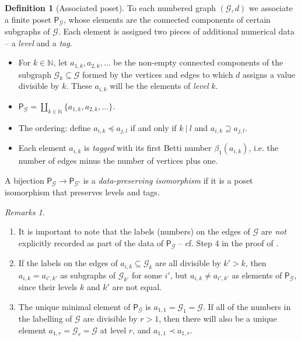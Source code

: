 \documentclass[11pt, a4 paper]{amsart}
\numberwithin{equation}{section}
\theoremstyle{remark}
\newtheorem{remarks}[theorem]{Remarks}
\theoremstyle{definition}
\newtheorem{definition}[theorem]{Definition}
\def\N{\mathbb N}
\def\b{\beta}
\begin{document}
\begin{definition}
[Associated poset]
	To each numbered graph $(\mathcal{G},d)$ we associate 
	a finite poset $\mathsf{P}_\mathcal{G}$, 
	whose elements are the connected components 
	of certain subgraphs of $\mathcal{G}$. 
	Each element is assigned two pieces of 
	additional numerical data -- a \emph{level} and a \emph{tag}.
	\begin{itemize}
		\item 
			For $k \in \N$, let $a_{1, k}, a_{2, k}, \ldots$
			be the non-empty connected components
			of the subgraph $\mathcal{G}_k \subseteq \mathcal{G}$
			formed by the vertices and edges 
			to which $d$ assigns a value divisible by $k$.
			These $a_{i,k}$ will be the elements of 
			\emph{level} $k$.
		\item 
			$\mathsf{P}_\mathcal{G} 
				= \coprod_{k\in\N}\{a_{1, k}, a_{2, k}, \ldots\}$.
		\item 
			The ordering: define %
			$a_{i, k} \preceq a_{j, l}$
			if and only if 
			$k\ |\ l$ and $a_{i, k} \supseteq a_{j, l}$. 
		\item 
			Each element $a_{i, k}$ is \emph{tagged}
			with its first Betti number $\b_1(a_{i, k})$,
			i.e. the number of edges 
			minus the number of vertices plus one. 
	\end{itemize}
	A bijection $\mathsf{P}_\mathcal{G}\to \mathsf{P}_\mathcal{G'}$ 
	is a {\em data-preserving isomorphism} 
	if it is a poset isomorphism that preserves levels and tags. 
\end{definition}

\begin{remarks} 
	\begin{enumerate}
		\item 
			It is important to note that the labels (numbers) 
			on the edges of $\mathcal{G}$ 
			are {\em not} explicitly recorded 
			as part of the data of $\mathsf{P}_\mathcal{G}$ 
			-- cf. Step 4 in the proof of 
			. 
		\item 
			If the labels on the edges of 
			$a_{i,k} \subseteq \mathcal{G}_k$ 
			are all divisible by $k' > k$, 
			then $a_{i,k}=a_{i',k'}$ 
			as subgraphs of $\mathcal{G}_{k'}$ for some $i'$, 
			but $a_{i,k}\neq a_{i',k'}$ 
			as elements of $\mathsf{P}_\mathcal{G}$, 
			since their levels $k$ and $k'$ are not equal. 
		\item 
			The unique minimal element of $\mathsf{P}_\mathcal{G}$ 
			is $a_{1,1}=\mathcal{G}_1=\mathcal{G}$. 
			If all of the numbers in the labelling of $\mathcal{G}$ 
			are divisible by $r>1$, 
			then there will also be a unique element 
			$a_{1,r}={\mathcal{G}_r}=\mathcal{G}$ 
			at level $r$, 
			and $a_{1,1}\prec a_{1,r}$. 
	\end{enumerate}
\end{remarks} 
\end{document}
